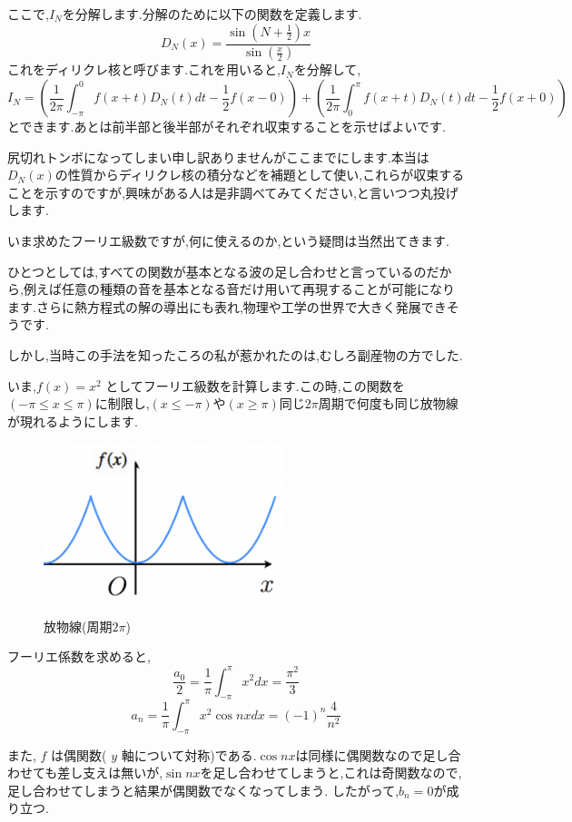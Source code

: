 ここで,$I_N$を分解します.分解のために以下の関数を定義します.
\[D_N(x) = \frac{\sin(N + \frac{1}{2})x}{\sin(\frac{x}{2})}\]
これをディリクレ核と呼びます.これを用いると,$I_N$を分解して,
\[
  I_N = (\frac{1}{2\pi} \int_{-\pi}^0 f(x+t) D_N(t) dt - \frac{1}{2} f(x-0)) +  (\frac{1}{2\pi} \int_0^\pi f(x+t) D_N(t) dt - \frac{1}{2} f(x+0))
\]
とできます.あとは前半部と後半部がそれぞれ収束することを示せばよいです.

尻切れトンボになってしまい申し訳ありませんがここまでにします.本当は$D_N(x)$の性質からディリクレ核の積分などを補題として使い,これらが収束することを示すのですが,興味がある人は是非調べてみてください,と言いつつ丸投げします.

いま求めたフーリエ級数ですが,何に使えるのか,という疑問は当然出てきます.

ひとつとしては,すべての関数が基本となる波の足し合わせと言っているのだから,例えば任意の種類の音を基本となる音だけ用いて再現することが可能になります.さらに熱方程式の解の導出にも表れ,物理や工学の世界で大きく発展できそうです.

しかし,当時この手法を知ったころの私が惹かれたのは,むしろ副産物の方でした.

いま,$f(x) = x^2$ としてフーリエ級数を計算します.この時,この関数を$({-\pi} \leq x \leq \pi)$に制限し,$(x \leq -\pi)$や$(x \geq \pi)$同じ${2\pi}$周期で何度も同じ放物線が現れるようにします.

\begin{figure}[h]
  \begin{center}
    \includegraphics[clip,width=7.0cm]{osawa.png}
    \caption{放物線(周期$2\pi$)}
    \label{f_para}
  \end{center}
\end{figure}

フーリエ係数を求めると,
\[
  \frac{a_0}{2} = \frac{1}{\pi} \int_{-\pi}^\pi x^2 dx = \frac{\pi^2}{3}
\]
\[
  a_n = \frac{1}{\pi} \int_{-\pi}^\pi x^2 \cos nx dx = (-1)^n \frac{4}{n^2}
\]

また, $f$ は偶関数( $y$ 軸について対称)である.$\cos nx$は同様に偶関数なので足し合わせても差し支えは無いが,$\sin nx$を足し合わせてしまうと,これは奇関数なので,足し合わせてしまうと結果が偶関数でなくなってしまう.
したがって,$b_n = 0$が成り立つ.

